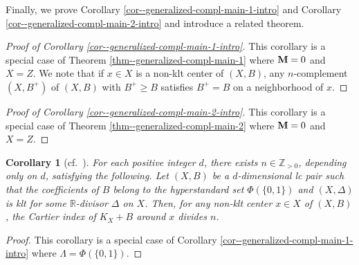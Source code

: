 \documentclass[12pt]{amsart}
\newtheorem{cor}[thm]{Corollary}
\theoremstyle{definition}
\begin{document}
Finally, we prove Corollary \ref{cor--generalized-compl-main-1-intro} and Corollary \ref{cor--generalized-compl-main-2-intro} and introduce a related theorem.  

\begin{proof}[Proof of Corollary \ref{cor--generalized-compl-main-1-intro}]
This corollary is a special case of Theorem \ref{thm--generalized-compl-main-1} where $\boldsymbol{\rm M}=0$ and $X=Z$. 
We note that if $x\in X$ is a non-klt center of $(X,B)$, any $n$-complement $(X,B^{+})$ of $(X,B)$ with $B^{+}\geq B$ satisfies $B^{+}=B$ on a neighborhood of $x$.  
\end{proof}

\begin{proof}[Proof of Corollary \ref{cor--generalized-compl-main-2-intro}]
This corollary is a special case of Theorem \ref{thm--generalized-compl-main-2} where $\boldsymbol{\rm M}=0$ and $X=Z$. 
\end{proof}



\begin{cor}[cf.~{\cite[Conjecture 0.2]{fujino-indices}}]\label{cor--compl-fujinoconj}
For each positive integer $d$, there exists $n \in \mathbb{Z}_{>0}$, depending only on $d$, satisfying the following. 
Let $(X,B)$ be a $d$-dimensional lc pair such that the coefficients of $B$ belong to the hyperstandard set $\Phi(\{0,1\})$ and $(X,\Delta)$ is klt for some $\mathbb{R}$-divisor $\Delta$ on $X$. 
Then, for any non-klt center $x \in X$ of $(X,B)$, the Cartier index of $K_{X}+B$ around $x$ divides $n$. 
\end{cor}

\begin{proof}
This corollary is a special case of Corollary \ref{cor--generalized-compl-main-1-intro} where $\Lambda=\Phi(\{0,1\})$. 
\end{proof}
\end{document}
